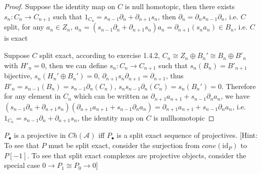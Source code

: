 \documentclass[../main.tex]{subfiles}
\begin{document}
\begin{proof}
Suppose the identity map on $C$ is null homotopic, then there exists $s_n:C_n\to C_{n+1}$ such that $1_{C_n}=s_{n-1}\partial_n+\partial_{n+1}s_n$, then $\partial_n=\partial_ns_{n-1}\partial_n$, i.e. $C$ split, for any $a_n\in Z_n$, $a_n=(s_{n-1}\partial_n+\partial_{n+1}s_n)a_n=\partial_{n+1}(s_na_n)\in B_n$, i.e. $C$ is exact \par
Suppose $C$ split exact, according to exercise 1.4.2, $C_n\cong Z_n\oplus B_n'\cong B_n\oplus B'_n$ with $H'_n=0$, then we can define $s_n:C_n\to C_{n+1}$ such that $s_n(B_n)= B'_{n+1}$ bijective, $s_{n}(H_n'\oplus B_n')=0$, $\partial_{n+1}s_n\partial_{n+1}=\partial_{n+1}$, thus $B'_n=s_{n-1}(B_n)=s_{n-1}\partial_n(C_n)$, $s_ns_{n-1}\partial_n(C_n)=s_n(B_n')=0$. Therefore for any element in $C_n$ which can be written as $\partial_{n+1}a_{n+1}+s_{n-1}\partial_na_n$, we have $(s_{n-1}\partial_n+\partial_{n+1}s_n)(\partial_{n+1}a_{n+1}+s_{n-1}\partial_na_n)=\partial_{n+1}a_{n+1}+s_{n-1}\partial_na_n$, i.e. $1_{C_n}=s_{n-1}\partial_n+\partial_{n+1}s_n$, the identity map on $C$ is nullhomotopic
\end{proof}

\begin{lemma}
$P_\bullet$ is a projective in $Ch(\mathscr A)$ iff $P_\bullet$ is a split exact sequence of projectives. [Hint: To see that $P$ must be split exact, consider the surjection from $cone(\mathrm{id}_P)$ to $P[-1]$. To see that split exact complexes are projective objects, consider the special case $0\to P_1\cong P_0\to0$]
\end{lemma}
\end{document}
